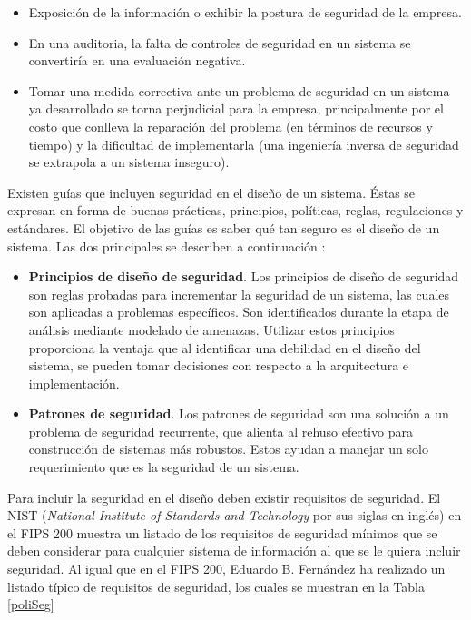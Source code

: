 \begin{itemize}[noitemsep]
	\item Exposición de la información o exhibir la postura de seguridad de la empresa.
	\item En una auditoria, la falta de controles de seguridad en un sistema se convertiría en una evaluación negativa. 
	\item Tomar una medida correctiva ante un problema de seguridad en un sistema ya desarrollado se torna perjudicial para la empresa, principalmente por el costo que conlleva la reparación del problema (en términos de recursos y tiempo) y la dificultad de implementarla (una ingeniería inversa de seguridad se extrapola a un sistema inseguro). 
\end{itemize}

Existen guías que incluyen seguridad en el diseño de un sistema. Éstas se expresan en forma de buenas prácticas, principios, políticas, reglas, regulaciones y estándares. El objetivo de las guías es saber qué tan seguro es el diseño de un sistema. Las dos principales se describen a continuación \cite{Mjo12}:
\begin{itemize}[noitemsep]
	\item \textbf{Principios de diseño de seguridad}. Los principios de diseño de seguridad son reglas probadas para incrementar la seguridad de un sistema, las cuales son aplicadas a problemas específicos. Son identificados durante la etapa de análisis mediante modelado de amenazas. Utilizar estos principios proporciona la ventaja que al identificar una debilidad en el diseño del sistema, se pueden tomar decisiones con respecto a la arquitectura e implementación. 
	
	\item \textbf{Patrones de seguridad}. Los patrones de seguridad son una solución a un problema de seguridad recurrente, que alienta al rehuso efectivo para construcción de sistemas más robustos. Estos ayudan a manejar un solo requerimiento que es la seguridad de un sistema. 
\end{itemize}

Para incluir la seguridad en el diseño deben existir requisitos de seguridad. El NIST (\textit{National Institute of Standards and Technology} por sus siglas en inglés) en el FIPS 200 muestra un listado de los requisitos de seguridad mínimos que se deben considerar para cualquier sistema de información al que se le quiera incluir seguridad. Al igual que en el FIPS 200, Eduardo B. Fernández ha realizado un listado típico de requisitos de seguridad, los cuales se muestran en la Tabla \ref{poliSeg}

